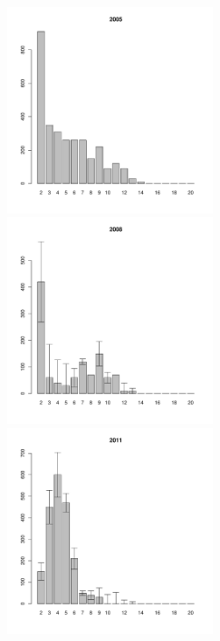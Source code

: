 \begin{figure}[hp]
\begin{minipage}[b]{.3\linewidth}
\begin{center}
	\end{center}
	\end{minipage}
	\begin{minipage}[b]{.3\linewidth}
	\begin{center}
	\includegraphics[width=60mm]{../White_Sea/Luvenga_Goreliy/high2_2005_.pdf}
	\end{center}
	\end{minipage}
	\hfill	
	\begin{minipage}[b]{.3\linewidth}
	\begin{center}
	\includegraphics[width=60mm]{../White_Sea/Luvenga_Goreliy/high2_2008_.pdf}
	\end{center}
	\end{minipage}
	\hfill
	\begin{minipage}[b]{.3\linewidth}
	\begin{center}
	\includegraphics[width=60mm]{../White_Sea/Luvenga_Goreliy/high2_2011_.pdf}

\end{center}
\end{minipage}
\end{figure}
